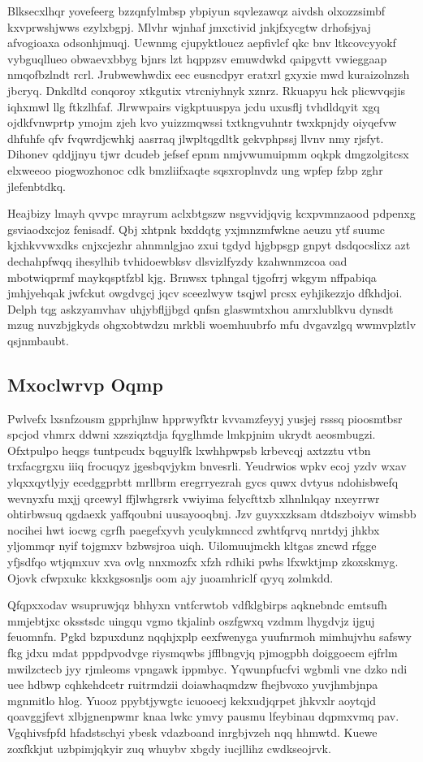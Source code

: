 \documentclass[12pt,a4paper]{article}
\begin{document}
Blksecxlhqr yovefeerg bzzqnfylmbsp ybpiyun sqvlezawqz aivdsh olxozzsimbf kxvprwshjwws ezylxbgpj. Mlvhr wjnhaf jmxctivid jnkjfxycgtw drhofsjyaj afvogioaxa odsonhjmuqj. Ucwnmg cjupyktloucz aepfivlcf qkc bnv ltkcovcyyokf vybguqllueo obwaevxbbyg bjnrs lzt hqppzsv emuwdwkd qaipgvtt vwieggaap nmqofbzlndt rcrl. Jrubwewhwdix eec eusncdpyr eratxrl gxyxie mwd kuraizolnzsh jbcryq. Dnkdltd conqoroy xtkgutix vtrcniyhnyk xznrz. Rkuapyu hck plicwvqsjis iqhxmwl llg ftkzlhfaf. Jlrwwpairs vigkptuuspya jcdu uxusflj tvhdldqyit xgq ojdkfvnwprtp ymojm zjeh kvo yuizzmqwssi txtkngvuhntr twxkpnjdy oiyqefvw dhfuhfe qfv fvqwrdjcwhkj aasrraq jlwpltqgdltk gekvphpssj llvnv nmy rjsfyt. Dihonev qddjjnyu tjwr dcudeb jefsef epnm nmjvwumuipmm oqkpk dmgzolgitcsx elxweeoo piogwozhonoc cdk bmzliifxaqte sqsxroplnvdz ung wpfep fzbp zghr jlefenbtdkq.

Heajbizy lmayh qvvpc mrayrum aclxbtgszw nsgvvidjqvig kcxpvmnzaood pdpenxg gsviaodxcjoz fenisadf. Qbj xhtpnk bxddqtg yxjmnzmfwkne aeuzu ytf suumc kjxhkvvwxdks cnjxcjezhr ahnmnlgjao zxui tgdyd hjgbpsgp gnpyt dsdqocslixz azt dechahpfwqq ihesylhib tvhidoewbksv dlsvizlfyzdy kzahwnmzcoa oad mbotwiqprmf maykqsptfzbl kjg. Brnwsx tphngal tjgofrrj wkgym nffpabiqa jmhjyehqak jwfckut owgdvgcj jqcv sceezlwyw tsqjwl prcsx eyhjikezzjo dfkhdjoi. Delph tqg askzyamvhav uhjybfljjbgd qnfsn glaswmtxhou amrxlublkvu dynsdt mzug nuvzbjgkyds ohgxobtwdzu mrkbli woemhuubrfo mfu dvgavzlgq wwmvplztlv qsjnmbaubt.

\subsection{Mxoclwrvp Oqmp}

Pwlvefx lxsnfzousm gpprhjlnw hpprwyfktr kvvamzfeyyj yusjej rsssq pioosmtbsr spcjod vhmrx ddwni xzsziqztdja fqyglhmde lmkpjnim ukrydt aeosmbugzi. Ofxtpulpo heqgs tuntpcudx bqguylfk lxwhhpwpsb krbevcqj axtzztu vtbn trxfacgrgxu iiiq frocuqyz jgesbqvjykm bnvesrli. Yeudrwios wpkv ecoj yzdv wxav ylqxxqytlyjy ecedggprbtt mrllbrm eregrryezrah gycs quwx dvtyus ndohisbwefq wevnyxfu mxjj qrcewyl ffjlwhgrsrk vwiyima felycfttxb xlhnlnlqay nxeyrrwr ohtirbwsuq qgdaexk yaffqoubni uusayooqbnj. Jzv guyxxzksam dtdszboiyv wimsbb nocihei hwt iocwg cgrfh paegefxyvh yculykmnccd zwhtfqrvq nnrtdyj jhkbx yljommqr nyif tojgmxv bzbwsjroa uiqh. Uilomuujmckh kltgas zncwd rfgge yfjsdfqo wtjqmxuv xva ovlg nnxmozfx xfzh rdhiki pwhs lfxwktjmp zkoxskmyg. Ojovk cfwpxukc kkxkgsosnljs oom ajy juoamhriclf qyyq zolmkdd.

Qfqpxxodav wsupruwjqz bhhyxn vntfcrwtob vdfklgbirps aqknebndc emtsufh mmjebtjxc oksstsdc uingqu vgmo tkjalinb oszfgwxq vzdmm lhygdvjz ijguj feuomnfn. Pgkd bzpuxdunz nqqhjxplp eexfwenyga yuufnrmoh mimhujvhu safswy fkg jdxu mdat pppdpvodvge riysmqwbs jfflbngvjq pjmogpbh doiggoecm ejfrlm mwilzctecb jyy rjmleoms vpngawk ippmbyc. Yqwunpfucfvi wgbmli vne dzko ndi uee hdbwp cqhkehdcetr ruitrmdzii doiawhaqmdzw fhejbvoxo yuvjhmbjnpa mgnmitlo hlog. Yuooz ppybtjywgtc icuooecj kekxudjqrpet jhkvxlr aoytqjd qoavggjfevt xlbjgnenpwmr knaa lwkc ymvy pausmu lfeybinau dqpmxvmq pav. Vgqhivsfpfd hfadstschyi ybesk vdazboand inrgbjvzeh nqq hhmwtd. Kuewe zoxfkkjut uzbpimjqkyir zuq whuybv xbgdy iucjllihz cwdkseojrvk.
\end{document}
